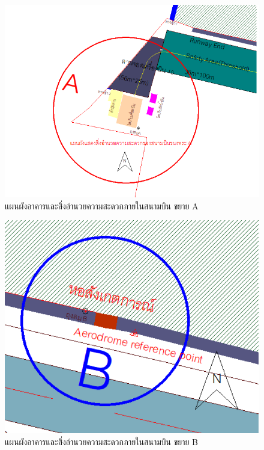 \begin{figure}[h!]
\begin{center}
\includegraphics[scale=0.75]{Picture3.png}
\caption{แผนผังอาคารและสิ่งอำนวยความสะดวกภายในสนามบิน ขยาย A}
\label{default}
\end{center}
\end{figure}

\begin{figure}[h!]
\begin{center}
\includegraphics[scale=0.65]{Picture4.png}
\caption{แผนผังอาคารและสิ่งอำนวยความสะดวกภายในสนามบิน ขยาย B}
\label{default}
\end{center}
\end{figure}

